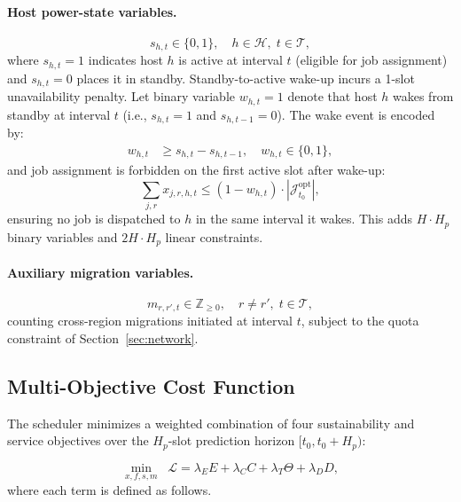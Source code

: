 \documentclass[a4paper,fleqn]{cas-dc}
\begin{document}
\paragraph{Host power-state variables.}
\begin{equation}
s_{h,t} \in \{0,1\}, \quad h \in \mathcal{H},\; t \in \mathcal{T},
\end{equation}
where $s_{h,t}=1$ indicates host $h$ is active at interval $t$ (eligible for job assignment) and $s_{h,t}=0$ places it in standby. Standby-to-active wake-up incurs a 1-slot unavailability penalty. Let binary variable $w_{h,t}=1$ denote that host $h$ wakes from standby at interval $t$ (i.e., $s_{h,t}=1$ and $s_{h,t-1}=0$). The wake event is encoded by:
\begin{align}
w_{h,t} &\geq s_{h,t} - s_{h,t-1}, \quad w_{h,t} \in \{0,1\},
\end{align}
and job assignment is forbidden on the first active slot after wake-up:
\begin{equation}
\sum_{j,r} x_{j,r,h,t} \leq (1 - w_{h,t}) \cdot |\mathcal{J}^{\mathrm{opt}}_{t_0}|,
\end{equation}
ensuring no job is dispatched to $h$ in the same interval it wakes. This adds $H \cdot H_p$ binary variables and $2H \cdot H_p$ linear constraints.

\paragraph{Auxiliary migration variables.}
\begin{equation}
m_{r,r',t} \in \mathbb{Z}_{\geq 0}, \quad r \neq r',\; t \in \mathcal{T},
\end{equation}
counting cross-region migrations initiated at interval $t$, subject to the quota constraint of Section~\ref{sec:network}.

\subsection{Multi-Objective Cost Function}
\label{sec:objective}

The scheduler minimizes a weighted combination of four sustainability and service objectives over the $H_p$-slot prediction horizon $[t_0, t_0 + H_p)$:

\begin{equation}
\label{eq:objective}
\min_{x,f,s,m} \;\; \mathcal{L} = \lambda_E E + \lambda_C C + \lambda_T \Theta + \lambda_D D,
\end{equation}
where each term is defined as follows.
\end{document}
